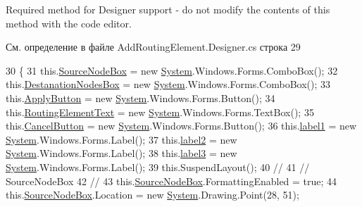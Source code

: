 Required method for Designer support -\/ do not modify the contents of this method with the code editor. 



См. определение в файле Add\+Routing\+Element.\+Designer.\+cs строка 29


\begin{DoxyCode}
30         \{
31             this.\hyperlink{class_desktop_network_analyzator_1_1_add_routing_element_a99e0f94879ded3763ca1efd408476f15}{SourceNodeBox} = \textcolor{keyword}{new} \hyperlink{namespace_system}{System}.Windows.Forms.ComboBox();
32             this.\hyperlink{class_desktop_network_analyzator_1_1_add_routing_element_aa266b6496dbd1b1c37d33eac098c3367}{DestanationNodesBox} = \textcolor{keyword}{new} \hyperlink{namespace_system}{System}.Windows.Forms.ComboBox();
33             this.\hyperlink{class_desktop_network_analyzator_1_1_add_routing_element_a881e04900de8cb8d7e0734bd6d4ce5a9}{ApplyButton} = \textcolor{keyword}{new} \hyperlink{namespace_system}{System}.Windows.Forms.Button();
34             this.\hyperlink{class_desktop_network_analyzator_1_1_add_routing_element_addd72bdde59da31d7c11eba45b4c4c56}{RoutingElementText} = \textcolor{keyword}{new} \hyperlink{namespace_system}{System}.Windows.Forms.TextBox();
35             this.\hyperlink{class_desktop_network_analyzator_1_1_add_routing_element_ab4cd9dc457b2beab02d78df432a55695}{CancelButton} = \textcolor{keyword}{new} \hyperlink{namespace_system}{System}.Windows.Forms.Button();
36             this.\hyperlink{class_desktop_network_analyzator_1_1_add_routing_element_aae16b705a59cfe2759cd8cda798c0f20}{label1} = \textcolor{keyword}{new} \hyperlink{namespace_system}{System}.Windows.Forms.Label();
37             this.\hyperlink{class_desktop_network_analyzator_1_1_add_routing_element_ac4aab0134a19193657cf3c881de0b987}{label2} = \textcolor{keyword}{new} \hyperlink{namespace_system}{System}.Windows.Forms.Label();
38             this.\hyperlink{class_desktop_network_analyzator_1_1_add_routing_element_a8ab52a205de9c87191fc4051b39787b3}{label3} = \textcolor{keyword}{new} \hyperlink{namespace_system}{System}.Windows.Forms.Label();
39             this.SuspendLayout();
40             \textcolor{comment}{// }
41             \textcolor{comment}{// SourceNodeBox}
42             \textcolor{comment}{// }
43             this.\hyperlink{class_desktop_network_analyzator_1_1_add_routing_element_a99e0f94879ded3763ca1efd408476f15}{SourceNodeBox}.FormattingEnabled = \textcolor{keyword}{true};
44             this.\hyperlink{class_desktop_network_analyzator_1_1_add_routing_element_a99e0f94879ded3763ca1efd408476f15}{SourceNodeBox}.Location = \textcolor{keyword}{new} \hyperlink{namespace_system}{System}.Drawing.Point(28, 51);

\end{DoxyCode}
